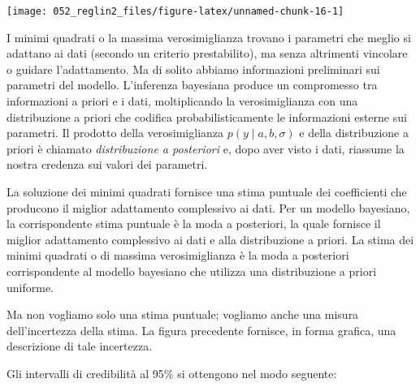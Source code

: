 \documentclass[
  10pt,
  italian,
  a4paper,
  extrafontsizes,onecolumn,openright
  ]{memoir}
\begin{document}
\begin{center}\texttt{[image: 052\_reglin2\_files/figure-latex/unnamed-chunk-16-1]} \end{center}

I minimi quadrati o la massima verosimiglianza trovano i parametri che meglio si adattano ai dati (secondo un criterio prestabilito), ma senza altrimenti vincolare o guidare l'adattamento. Ma di solito abbiamo informazioni preliminari sui parametri del modello. L'inferenza bayesiana produce un compromesso tra informazioni a priori e i dati, moltiplicando la verosimiglianza con una distribuzione a priori che codifica probabilisticamente le informazioni esterne sui parametri. Il prodotto della verosimiglianza \(p(y \mid a, b, \sigma)\) e della distribuzione a priori è chiamato \emph{distribuzione a posteriori} e, dopo aver visto i dati, riassume la nostra credenza sui valori dei parametri.

La soluzione dei minimi quadrati fornisce una stima puntuale dei coefficienti che producono il miglior adattamento complessivo ai dati. Per un modello bayesiano, la corrispondente stima puntuale è la moda a posteriori, la quale fornisce il miglior adattamento complessivo ai dati e alla distribuzione a priori. La stima dei minimi quadrati o di massima verosimiglianza è la moda a posteriori corrispondente al modello bayesiano che utilizza una distribuzione a priori uniforme.

Ma non vogliamo solo una stima puntuale; vogliamo anche una misura dell'incertezza della stima. La figura precedente fornisce, in forma grafica, una descrizione di tale incertezza.

Gli intervalli di credibilità al 95\% si ottengono nel modo seguente:
\end{document}
